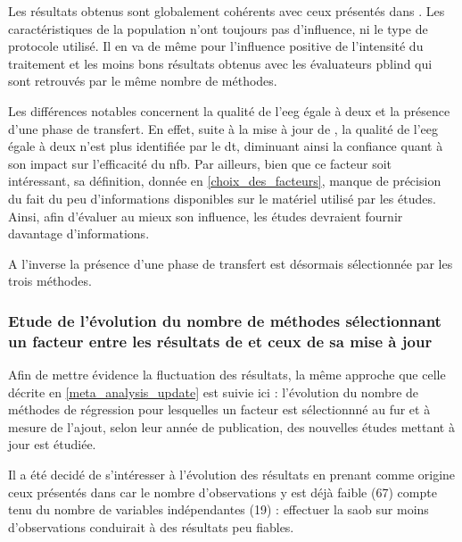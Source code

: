 Les résultats obtenus sont globalement cohérents avec ceux présentés dans \citet{Bussalb2019clinical}. Les caractéristiques de la population n'ont toujours pas d'influence, ni
le type de protocole utilisé. Il en va de même pour l'influence positive de l'intensité du traitement et les moins bons résultats obtenus avec les évaluateurs \gls{pblind} qui sont
retrouvés par le même nombre de méthodes. 

Les différences notables concernent la qualité de l'\gls{eeg} égale à deux et la présence d'une phase de transfert. En effet, suite à la mise à jour de \citet{Bussalb2019clinical}, 
la qualité de l'\gls{eeg} égale à deux 
n'est plus identifiée par le \gls{dt}, diminuant ainsi la confiance quant à son impact sur l'efficacité du \gls{nfb}. Par ailleurs, bien que ce facteur soit intéressant, sa définition, 
donnée en \ref{choix_des_facteurs}, manque de précision 
du fait du peu d'informations disponibles sur le matériel utilisé par les études. Ainsi, afin d'évaluer au mieux son influence, les études devraient fournir 
davantage d'informations.

A l'inverse la présence d'une phase de transfert est désormais sélectionnée par les trois méthodes.

\subsubsection{Etude de l'évolution du nombre de méthodes sélectionnant un facteur entre les résultats de \citet{Bussalb2019clinical} et ceux de sa mise à jour} \label{evolution_methods}
Afin de mettre évidence la fluctuation des résultats, la même approche que celle décrite en \ref{meta_analysis_update} est suivie ici : l'évolution du nombre de méthodes de régression pour 
lesquelles un facteur est sélectionnné au fur et à mesure de l'ajout,
selon leur année de publication, des nouvelles études mettant à jour \citet{Bussalb2019clinical} est étudiée. 

Il a été decidé de s'intéresser à l'évolution des résultats en prenant comme origine ceux présentés dans \citet{Bussalb2019clinical} car le nombre d'observations y est déjà faible (67) compte tenu du nombre 
de variables indépendantes (19) : effectuer la \gls{saob} sur moins d'observations conduirait à des résultats peu fiables. 

